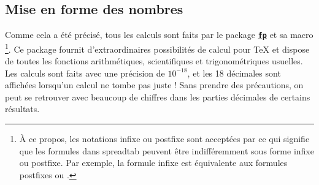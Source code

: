 \documentclass[a4paper,10pt]{article}
\newcommand\ST{\textsf{spreadtab}\xspace}
\newcommand\falseverb[1]{\texttt{\detokenize{#1}}}
\begin{document}
\subsection{Mise en forme des nombres}
Comme cela a été précisé, tous les calculs sont faits par le package \href{http://www.ctan.org/tex-archive/macros/latex/contrib/fp/}{\texttt{\textbf{fp}}} et sa macro \falseverb{\FPeval}\footnote{À ce propos, les notations infixe ou postfixe sont acceptées par {\ttfamily\string\FPeval} ce qui signifie que les formules dans \ST peuvent être indifféremment sous forme infixe ou postfixe. Par exemple, la formule infixe \og\falseverb{a1+b1}\fg{} est équivalente aux formules postfixes \og\falseverb{a1 b1 add}\fg{} ou \og\falseverb{a1 b1 +}\fg.}. Ce package fournit d'extraordinaires possibilités de calcul pour \TeX{} et dispose de toutes les fonctions arithmétiques, scientifiques et trigonométriques usuelles. Les calculs sont faits avec une précision de $10^{-18}$, et les 18 décimales sont affichées lorsqu'un calcul ne tombe pas juste ! Sans prendre des précautions, on peut se retrouver avec beaucoup de chiffres dans les parties décimales de certains résultats.
\end{document}
